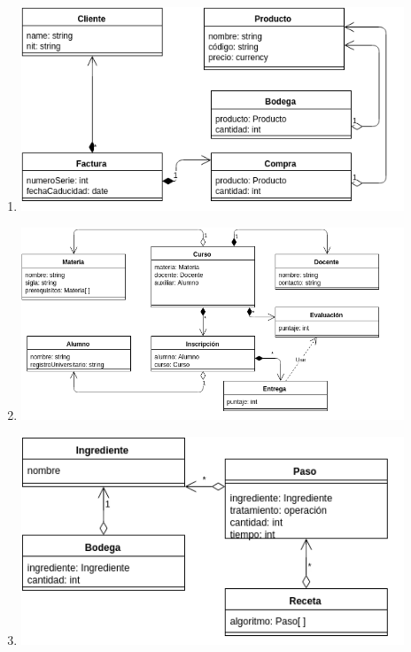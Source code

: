 \begin{enumerate}[a]
\item \includegraphics[width=0.9\textwidth]{img/2-a.png}
\item \includegraphics[width=0.9\textwidth]{img/2-b.png}
\item \includegraphics[width=0.9\textwidth]{img/2-c.png}
\end{enumerate}
